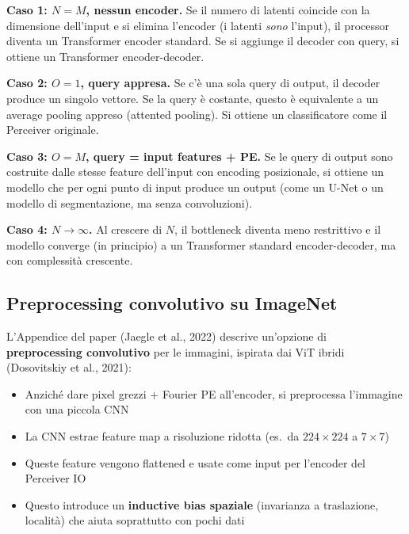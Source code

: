 \documentclass[12pt,a4paper]{article}
\begin{document}
\begin{proofbox}
\textbf{Caso 1: $N = M$, nessun encoder.} Se il numero di latenti coincide con la dimensione dell'input e si elimina l'encoder (i latenti \emph{sono} l'input), il processor diventa un Transformer encoder standard. Se si aggiunge il decoder con query, si ottiene un Transformer encoder-decoder.

\textbf{Caso 2: $O = 1$, query appresa.} Se c'\`e una sola query di output, il decoder produce un singolo vettore. Se la query \`e costante, questo \`e equivalente a un average pooling appreso (attented pooling). Si ottiene un classificatore come il Perceiver originale.

\textbf{Caso 3: $O = M$, query = input features + PE.} Se le query di output sono costruite dalle stesse feature dell'input con encoding posizionale, si ottiene un modello che per ogni punto di input produce un output (come un U-Net o un modello di segmentazione, ma senza convoluzioni).

\textbf{Caso 4: $N \to \infty$.} Al crescere di $N$, il bottleneck diventa meno restrittivo e il modello converge (in principio) a un Transformer standard encoder-decoder, ma con complessit\`a crescente.
\end{proofbox}


\subsection{Preprocessing convolutivo su ImageNet}

L'Appendice del paper (Jaegle et al., 2022) descrive un'opzione di \textbf{preprocessing convolutivo} per le immagini, ispirata dai ViT ibridi (Dosovitskiy et al., 2021):

\begin{itemize}
    \item Anzich\'e dare pixel grezzi + Fourier PE all'encoder, si preprocessa l'immagine con una piccola CNN
    \item La CNN estrae feature map a risoluzione ridotta (es.\ da $224 \times 224$ a $7 \times 7$)
    \item Queste feature vengono flattened e usate come input per l'encoder del Perceiver IO
    \item Questo introduce un \textbf{inductive bias spaziale} (invarianza a traslazione, localit\`a) che aiuta soprattutto con pochi dati
\end{itemize}
\end{document}

